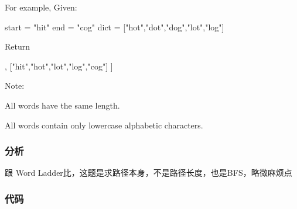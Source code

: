 For example, Given:
\begin{Code}
start = "hit"
end = "cog"
dict = ["hot","dot","dog","lot","log"]
\end{Code}
Return
\begin{Code}
[
    ["hit","hot","dot","dog","cog"],
    ["hit","hot","lot","log","cog"]
]
\end{Code}

Note:
\begindot
\item All words have the same length.
\item All words contain only lowercase alphabetic characters.
\myenddot


\subsubsection{分析}
跟 Word Ladder比，这题是求路径本身，不是路径长度，也是BFS，略微麻烦点


\subsubsection{代码}

